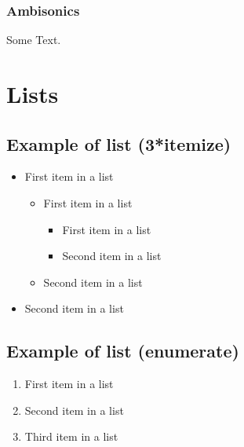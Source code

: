\documentclass[paper=a4, fontsize=11pt]{scrartcl} %
\numberwithin{equation}{section} %
\numberwithin{figure}{section} %
\numberwithin{table}{section} %
\begin{document}
\subsubsection{Ambisonics}

Some Text.\\


\section{Lists}


\subsection{Example of list (3*itemize)}
\begin{itemize}
	\item First item in a list 
		\begin{itemize}
		\item First item in a list 
			\begin{itemize}
			\item First item in a list 
			\item Second item in a list 
			\end{itemize}
		\item Second item in a list 
		\end{itemize}
	\item Second item in a list 
\end{itemize}


\subsection{Example of list (enumerate)}
\begin{enumerate}
\item First item in a list 
\item Second item in a list 
\item Third item in a list
\end{enumerate}
\end{document}
